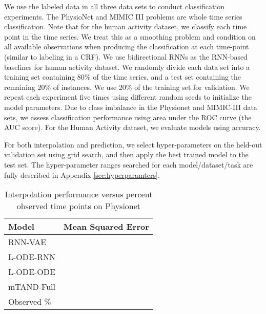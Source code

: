 \documentclass{article} \usepackage{iclr2021_conference,times}
\begin{document}
We use the labeled data in all three data sets to conduct classification experiments. The PhysioNet and MIMIC III problems are whole time series classification. Note that for the human activity dataset, we classify each time point in the time series. We treat this as a smoothing problem and condition on all available observations when producing the classification at each time-point (similar to labeling in a CRF). We use bidirectional RNNs as the RNN-based baselines for human activity dataset. We randomly divide each data set into a training set containing 80\% of the time series,  and a test set containing the remaining 20\% of instances. We use 20\% of the training set for validation. We repeat each experiment five times using different random seeds to initialize the model parameters. Due to class imbalance in the Physionet and MIMIC-III data sets, we assess classification performance using area under the ROC curve (the AUC score). For the Human Activity dataset, we evaluate models using accuracy. 

For both interpolation and prediction, we select hyper-parameters on the held-out validation set using grid search, and then apply the best trained model to the test set. The hyper-parameter ranges searched for each model/dataset/task are fully described in Appendix \ref{sec:hyperparamters}.

\begin{table}[t]
\centering
\scriptsize
\caption{Interpolation performance versus percent observed time points on Physionet}
\label{table:phy_interp}
\begin{tabular}[h]{l c c c c c}
     \toprule
     {\bf Model} & \multicolumn{5}{c}{{\bf Mean Squared Error} } \\
     \midrule
     RNN-VAE &  &  &  &  &  \\
     L-ODE-RNN &  &  &  &  &  \\
     L-ODE-ODE &  &  &  &  &  \\
     mTAND-Full &  &  &  &  &  \\
     \midrule
     Observed \%  &  &  &  &  &  \\ 
    \bottomrule
\end{tabular}
\end{table}
\end{document}
